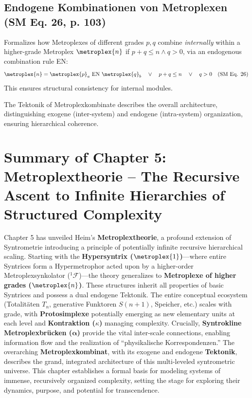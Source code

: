 \documentclass[
    12pt,              %
    a4paper,           %
    headings=normal,   %
    twoside=true,      %
    BCOR=8mm,          %
]{scrbook}
\newcommand{\q}[1]{\enquote{#1}}
\newcommand{\hypersyntrix}{\metroplex{1}}
\newcommand{\metroplexsynkolator}[1]{{}^{#1}\mathcal{F}}
\newcommand{\metroplextotalitaet}[1]{T_{#1}}
\newcommand{\metroplexfunktor}{S}
\begin{document}
\subsection{Endogene Kombinationen von Metroplexen (SM Eq. 26, p. 103)}
\label{sec:ch5_endogene_kombinationen}
Formalizes how Metroplexes of different grades \(p,q\) combine \textit{internally} within a higher-grade Metroplex \(\metroplex{n}\) if \(p+q \le n \land q > 0\), via an endogenous combination rule EN:
\begin{equation} \label{eq:original_endogene_kombination} %
\metroplex{n} = {\metroplex{p}_a} \text{ EN } {\metroplex{q}_b} \quad \lor \quad p+q \le n \quad \lor \quad q > 0 \quad (\text{SM Eq. 26})
\end{equation}
This ensures structural consistency for internal modules.

The Tektonik of Metroplexkombinate describes the overall architecture, distinguishing exogene (inter-system) and endogene (intra-system) organization, ensuring hierarchical coherence.

\section{Summary of Chapter 5: Metroplextheorie – The Recursive Ascent to Infinite Hierarchies of Structured Complexity}
\label{sec:ch5_summary}

Chapter 5 has unveiled Heim's \textbf{Metroplextheorie}, a profound extension of Syntrometrie introducing a principle of potentially infinite recursive hierarchical scaling. Starting with the \textbf{Hypersyntrix (\(\hypersyntrix\))}—where entire Syntrices form a Hypermetrophor acted upon by a higher-order Metroplexsynkolator (\(\metroplexsynkolator{1}\))—the theory generalizes to \textbf{Metroplexe of higher grades (\(\metroplex{n}\))}. These structures inherit all properties of basic Syntrices and possess a dual endogene Tektonik. The entire conceptual ecosystem (Totalitäten \(\metroplextotalitaet{n}\), generative Funktoren \(\metroplexfunktor(n+1)\), Speicher, etc.) scales with grade, with \textbf{Protosimplexe} potentially emerging as new elementary units at each level and \textbf{Kontraktion (\(\kappa\))} managing complexity. Crucially, \textbf{Syntrokline Metroplexbrücken (\(\bm{\alpha}\))} provide the vital inter-scale connections, enabling information flow and the realization of \q{physikalische Korrespondenzen.} The overarching \textbf{Metroplexkombinat}, with its exogene and endogene \textbf{Tektonik}, describes the grand, integrated architecture of this multi-leveled syntrometric universe. This chapter establishes a formal basis for modeling systems of immense, recursively organized complexity, setting the stage for exploring their dynamics, purpose, and potential for transcendence.
\end{document}
